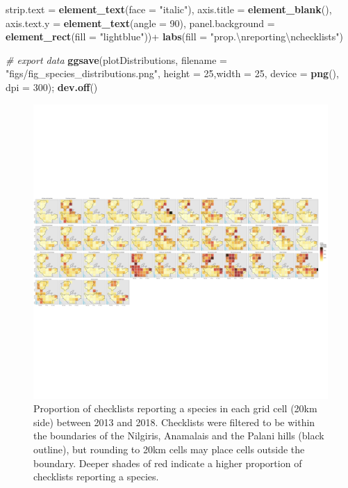 \documentclass[]{article}
\newenvironment{Shaded}{}{}
\newcommand{\CharTok}[1]{\textcolor[rgb]{0.25,0.44,0.63}{#1}}
\newcommand{\CommentTok}[1]{\textcolor[rgb]{0.38,0.63,0.69}{\textit{#1}}}
\newcommand{\DataTypeTok}[1]{\textcolor[rgb]{0.56,0.13,0.00}{#1}}
\newcommand{\DecValTok}[1]{\textcolor[rgb]{0.25,0.63,0.44}{#1}}
\newcommand{\KeywordTok}[1]{\textcolor[rgb]{0.00,0.44,0.13}{\textbf{#1}}}
\newcommand{\NormalTok}[1]{#1}
\newcommand{\OperatorTok}[1]{\textcolor[rgb]{0.40,0.40,0.40}{#1}}
\newcommand{\StringTok}[1]{\textcolor[rgb]{0.25,0.44,0.63}{#1}}
\begin{document}
\begin{Shaded}
\begin{Highlighting}[]
        \DataTypeTok{strip.text =} \KeywordTok{element_text}\NormalTok{(}\DataTypeTok{face =} \StringTok{"italic"}\NormalTok{),}
        \DataTypeTok{axis.title =} \KeywordTok{element_blank}\NormalTok{(),}
        \DataTypeTok{axis.text.y =} \KeywordTok{element_text}\NormalTok{(}\DataTypeTok{angle =} \DecValTok{90}\NormalTok{),}
        \DataTypeTok{panel.background =} \KeywordTok{element_rect}\NormalTok{(}\DataTypeTok{fill =} \StringTok{"lightblue"}\NormalTok{))}\OperatorTok{+}
\StringTok{  }\KeywordTok{labs}\NormalTok{(}\DataTypeTok{fill =} \StringTok{"prop.}\CharTok{\textbackslash{}n}\StringTok{reporting}\CharTok{\textbackslash{}n}\StringTok{checklists"}\NormalTok{)}
  
\CommentTok{# export data}
\KeywordTok{ggsave}\NormalTok{(plotDistributions, }
       \DataTypeTok{filename =} \StringTok{"figs/fig_species_distributions.png"}\NormalTok{,}
       \DataTypeTok{height =} \DecValTok{25}\NormalTok{,}\DataTypeTok{width =} \DecValTok{25}\NormalTok{, }\DataTypeTok{device =} \KeywordTok{png}\NormalTok{(), }\DataTypeTok{dpi =} \DecValTok{300}\NormalTok{); }\KeywordTok{dev.off}\NormalTok{()}
\end{Highlighting}
\end{Shaded}

\begin{figure}
\centering
\includegraphics{figs/fig_species_distributions.png}
\caption{Proportion of checklists reporting a species in each grid cell (20km side) between 2013 and 2018. Checklists were filtered to be within the boundaries of the Nilgiris, Anamalais and the Palani hills (black outline), but rounding to 20km cells may place cells outside the boundary. Deeper shades of red indicate a higher proportion of checklists reporting a species.}
\end{figure}
\end{document}
